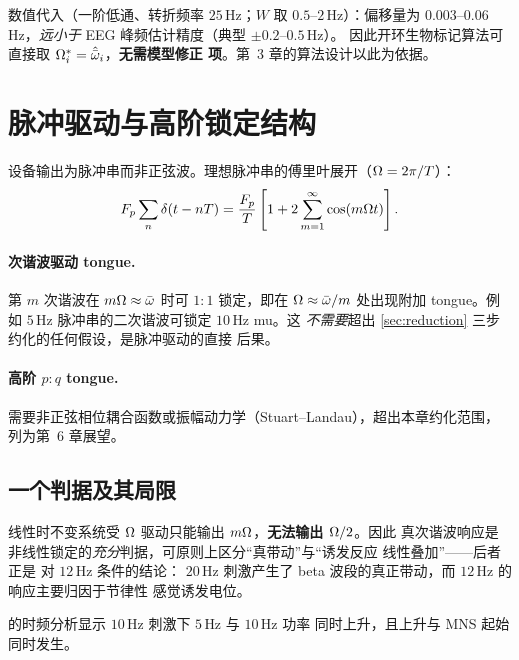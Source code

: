 \begin{remark}[一个有实用价值的正面结论]\label{rem:offsetsmall}
数值代入（一阶低通、转折频率 $25\,$Hz；$W$ 取 $0.5$–$2\,$Hz）：偏移量为
$0.003$–$0.06\,$Hz，\emph{远小于} EEG 峰频估计精度（典型 $\pm0.2$–$0.5\,$Hz）。
因此开环生物标记算法可直接取 $\Omega^{*}_i=\hat{\bar{\omega}}_i$，\textbf{无需模型修正
项}。第~3 章的算法设计以此为依据。
\end{remark}

\section{脉冲驱动与高阶锁定结构}
\label{sec:pulse}

设备输出为脉冲串而非正弦波。理想脉冲串的傅里叶展开（$\Omega=2\pi/T$）：
%
\begin{equation}\label{eq:pulse}
F_p\sum_{n}\delta(t-nT)
=\frac{F_p}{T}\left[1+2\sum_{m=1}^{\infty}\cos(m\Omega t)\right].
\end{equation}

\paragraph{次谐波驱动 tongue.}
第 $m$ 次谐波在 $m\Omega\approx\bar{\omega}$ 时可 $1{:}1$ 锁定，即在 $\Omega\approx\bar{\omega}/m$
处出现附加 tongue。例如 $5\,$Hz 脉冲串的二次谐波可锁定 $10\,$Hz mu。这
\emph{不需要}超出 \cref{sec:reduction} 三步约化的任何假设，是脉冲驱动的直接
后果。

\paragraph{高阶 $p{:}q$ tongue.}
需要非正弦相位耦合函数或振幅动力学（Stuart--Landau），超出本章约化范围，
列为第~6 章展望。

\subsection{一个判据及其局限}
\label{sec:subharm}

线性时不变系统受 $\Omega$ 驱动只能输出 $m\Omega$，\textbf{无法输出 $\Omega/2$}。因此
真次谐波响应是非线性锁定的\emph{充分}判据，可原则上区分“真带动”与“诱发反应
线性叠加”——后者正是 \citet{Houlgreave2022} 对 $12\,$Hz 条件的结论：
$20\,$Hz 刺激产生了 beta 波段的真正带动，而 $12\,$Hz 的响应主要归因于节律性
感觉诱发电位。

\citet{Morera2026} 的时频分析显示 $10\,$Hz 刺激下 $5\,$Hz 与 $10\,$Hz 功率
同时上升，且上升与 MNS 起始同时发生。


